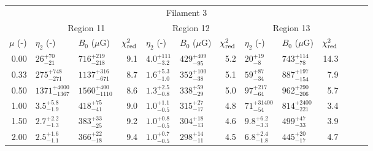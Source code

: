 \begin{tabular}{@{}r llr llr llr llr@{}}

\toprule
\multicolumn{13}{c}{Filament 3} \\
\cmidrule{1-13}
{} & \multicolumn{3}{c}{Region 11}
   & \multicolumn{3}{c}{Region 12}
   & \multicolumn{3}{c}{Region 13} \\
\cmidrule(lr){2-4} \cmidrule(lr){5-7} \cmidrule(lr){8-10}
$\mu$ (-) & $\eta_2$ (-) & $B_0$ ($\mu$G) & $\chi^2_{\mathrm{red}}$
          & $\eta_2$ (-) & $B_0$ ($\mu$G) & $\chi^2_{\mathrm{red}}$
          & $\eta_2$ (-) & $B_0$ ($\mu$G) & $\chi^2_{\mathrm{red}}$ \\
\cmidrule{1-10}
0.00 & ${26}^{+70}_{-21}$ & ${716}^{+219}_{-218}$ & 9.1
     & ${4.0}^{+111}_{-3.2}$ & ${429}^{+409}_{-95}$ & 5.2
     & ${20}^{+19}_{-8}$ & ${743}^{+114}_{-78}$ & 14.3 \\
0.33 & ${275}^{+748}_{-271}$ & ${1137}^{+316}_{-671}$ & 8.7
     & ${1.6}^{+5.3}_{-1.0}$ & ${352}^{+100}_{-38}$ & 5.1
     & ${59}^{+87}_{-34}$ & ${887}^{+197}_{-154}$ & 7.9 \\
0.50 & ${1371}^{+4000}_{-1367}$ & ${1560}^{+400}_{-1110}$ & 8.6
     & ${1.3}^{+2.5}_{-0.8}$ & ${338}^{+59}_{-29}$ & 5.0
     & ${97}^{+217}_{-64}$ & ${962}^{+290}_{-206}$ & 5.7 \\
1.00 & ${3.5}^{+5.8}_{-1.9}$ & ${418}^{+75}_{-41}$ & 9.0
     & ${1.0}^{+1.1}_{-0.5}$ & ${315}^{+27}_{-17}$ & 4.8
     & ${71}^{+31400}_{-54}$ & ${814}^{+2400}_{-221}$ & 3.4 \\
1.50 & ${2.7}^{+2.2}_{-1.3}$ & ${383}^{+33}_{-25}$ & 9.2
     & ${1.0}^{+0.8}_{-0.5}$ & ${304}^{+18}_{-13}$ & 4.6
     & ${9.8}^{+6.2}_{-3.3}$ & ${499}^{+47}_{-33}$ & 3.9 \\
2.00 & ${2.5}^{+1.6}_{-1.1}$ & ${366}^{+22}_{-18}$ & 9.4
     & ${1.0}^{+0.7}_{-0.5}$ & ${298}^{+14}_{-11}$ & 4.5
     & ${6.8}^{+2.4}_{-1.8}$ & ${445}^{+20}_{-17}$ & 4.7 \\


\end{tabular}
